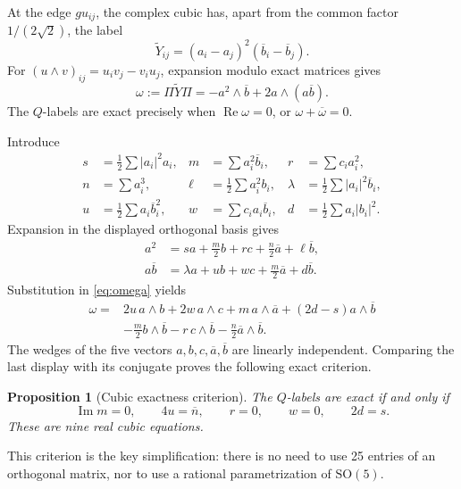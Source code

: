 \documentclass[11pt,reqno]{amsart}
\newtheorem{proposition}[theorem]{Proposition}
\theoremstyle{remark}
\newcommand{\SO}{\mathrm{SO}}
\newcommand{\abs}[1]{\left\lvert #1\right\rvert}
\begin{document}
At the edge $gu_{ij}$, the complex cubic has, apart from the common factor
$1/(2\sqrt2)$, the label
\[
 \widetilde Y_{ij}=(a_i-a_j)^2(\overline b_i-\overline b_j).
\]
For $(u\wedge v)_{ij}=u_iv_j-v_iu_j$, expansion modulo exact matrices gives
\begin{equation}\label{eq:omega}
 \omega:=\Pi\widetilde Y\Pi
 =-a^2\wedge\overline b+2a\wedge(a\overline b).
\end{equation}
The $Q$-labels are exact precisely when
$\operatorname{Re}\omega=0$, or $\omega+\overline\omega=0$.

Introduce
\begin{align*}
 s&=\frac12\sum\abs{a_i}^2a_i,&
 m&=\sum a_i^2\overline b_i,&
 r&=\sum c_i a_i^2,\\
 n&=\sum a_i^3,&
 \ell&=\frac12\sum a_i^2b_i,&
 \lambda&=\frac12\sum\abs{a_i}^2\overline b_i,\\
 u&=\frac12\sum a_i\overline b_i^2,&
 w&=\sum c_i a_i\overline b_i,&
 d&=\frac12\sum a_i\abs{b_i}^2.
\end{align*}
Expansion in the displayed orthogonal basis gives
\begin{align*}
 a^2&=sa+\frac m2b+rc+\frac n2\overline a+\ell\overline b,\\
 a\overline b&=\lambda a+ub+wc+\frac m2\overline a+d\overline b.
\end{align*}
Substitution in \eqref{eq:omega} yields
\begin{align*}
 \omega={}&2u\,a\wedge b+2w\,a\wedge c+m\,a\wedge\overline a
 +(2d-s)a\wedge\overline b\\
 &-\frac m2b\wedge\overline b-r\,c\wedge\overline b
 -\frac n2\overline a\wedge\overline b.
\end{align*}
The wedges of the five vectors $a,b,c,\overline a,\overline b$ are linearly
independent.  Comparing the last display with its conjugate proves the
following exact criterion.

\begin{proposition}[Cubic exactness criterion]\label{prop:criterion}
The $Q$-labels are exact if and only if
\begin{equation}\label{eq:nine}
 \operatorname{Im}m=0,\qquad
 4u=\overline n,\qquad
 r=0,\qquad w=0,\qquad 2d=s.
\end{equation}
These are nine real cubic equations.
\end{proposition}

This criterion is the key simplification: there is no need to use 25 entries
of an orthogonal matrix, nor to use a rational parametrization of
$\SO(5)$.
\end{document}
